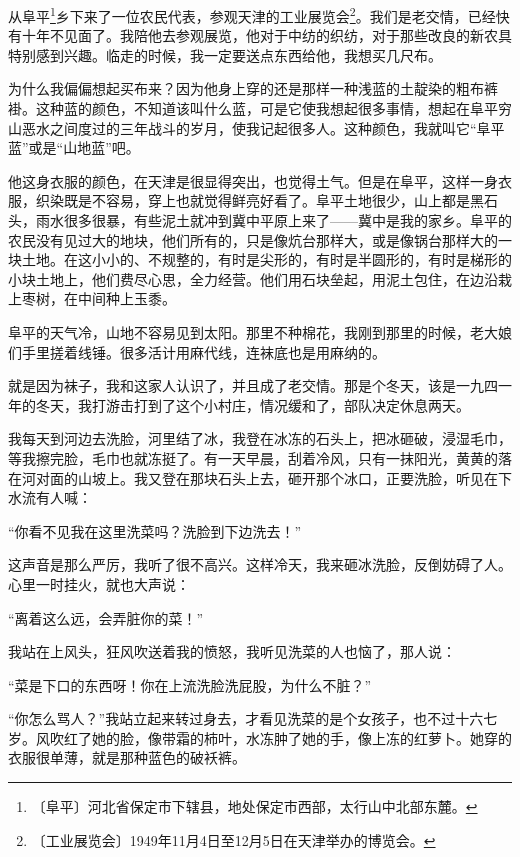 \documentclass[12pt,UTF-8,openany]{ctexbook}
\begin{document}
\begin{normalsize}
    
    从阜平\footnote{〔阜平〕河北省保定市下辖县，地处保定市西部，太行山中北部东麓。}乡下来了一位农民代表，参观天津的工业展览会\footnote{〔工业展览会〕1949年11月4日至12月5日在天津举办的博览会。}。我们是老交情，已经快有十年不见面了。我陪他去参观展览，他对于中纺的织纺，对于那些改良的新农具特别感到兴趣。临走的时候，我一定要送点东西给他，我想买几尺布。
    
    为什么我偏偏想起买布来？因为他身上穿的还是那样一种浅蓝的土靛染的粗布裤褂。这种蓝的颜色，不知道该叫什么蓝，可是它使我想起很多事情，想起在阜平穷山恶水之间度过的三年战斗的岁月，使我记起很多人。这种颜色，我就叫它“阜平蓝”或是“山地蓝”吧。
    
    他这身衣服的颜色，在天津是很显得突出，也觉得土气。但是在阜平，这样一身衣服，织染既是不容易，穿上也就觉得鲜亮好看了。阜平土地很少，山上都是黑石头，雨水很多很暴，有些泥土就冲到冀中平原上来了——冀中是我的家乡。阜平的农民没有见过大的地块，他们所有的，只是像炕台那样大，或是像锅台那样大的一块土地。在这小小的、不规整的，有时是尖形的，有时是半圆形的，有时是梯形的小块土地上，他们费尽心思，全力经营。他们用石块垒起，用泥土包住，在边沿栽上枣树，在中间种上玉黍。
    
    阜平的天气冷，山地不容易见到太阳。那里不种棉花，我刚到那里的时候，老大娘们手里搓着线锤。很多活计用麻代线，连袜底也是用麻纳的。
    
    就是因为袜子，我和这家人认识了，并且成了老交情。那是个冬天，该是一九四一年的冬天，我打游击打到了这个小村庄，情况缓和了，部队决定休息两天。
    
    我每天到河边去洗脸，河里结了冰，我登在冰冻的石头上，把冰砸破，浸湿毛巾，等我擦完脸，毛巾也就冻挺了。有一天早晨，刮着冷风，只有一抹阳光，黄黄的落在河对面的山坡上。我又登在那块石头上去，砸开那个冰口，正要洗脸，听见在下水流有人喊：
    
    “你看不见我在这里洗菜吗？洗脸到下边洗去！”
    
    这声音是那么严厉，我听了很不高兴。这样冷天，我来砸冰洗脸，反倒妨碍了人。心里一时挂火，就也大声说：
    
    “离着这么远，会弄脏你的菜！”
    
    我站在上风头，狂风吹送着我的愤怒，我听见洗菜的人也恼了，那人说：
    
    “菜是下口的东西呀！你在上流洗脸洗屁股，为什么不脏？”
    
    “你怎么骂人？”我站立起来转过身去，才看见洗菜的是个女孩子，也不过十六七岁。风吹红了她的脸，像带霜的柿叶，水冻肿了她的手，像上冻的红萝卜。她穿的衣服很单薄，就是那种蓝色的破袄裤。
    

\end{normalsize}
\end{document}
